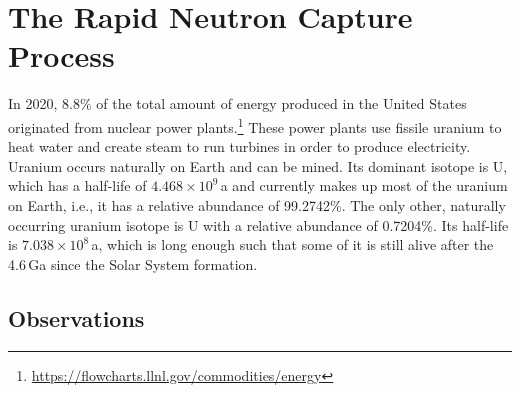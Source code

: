 
\chapter{The Rapid Neutron Capture Process}\label{ch:r-process}

In 2020, 8.8\% of the total amount of energy produced in the United States originated from nuclear power plants.\footnote{\url{https://flowcharts.llnl.gov/commodities/energy}} These power plants use fissile uranium to heat water and create steam to run turbines in order to produce electricity. Uranium occurs naturally on Earth and can be mined. Its dominant isotope is U, which has a half-life of $4.468\times10^9$\,a and currently makes up most of the uranium on Earth, i.e., it has a relative abundance of 99.2742\%. The only other, naturally occurring uranium isotope is U with a relative abundance of 0.7204\%. Its half-life is $7.038\times10^8$\,a, which is long enough such that some of it is still alive after the 4.6\,Ga since the Solar System formation.

\section{Observations}\label{sec:r-process:observations}

